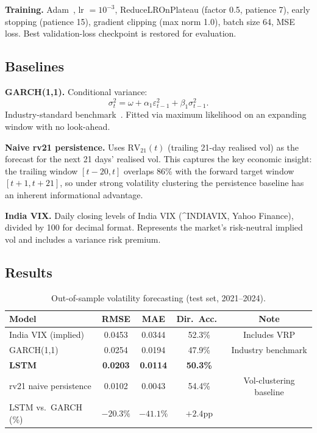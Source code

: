 \documentclass[12pt,a4paper]{article}
\begin{document}
\textbf{Training.}  Adam~\citep{Kingma2015}, lr $= 10^{-3}$,
ReduceLROnPlateau (factor 0.5, patience 7), early stopping (patience 15),
gradient clipping (max norm 1.0), batch size 64, MSE loss.
Best validation-loss checkpoint is restored for evaluation.

\subsection{Baselines}

\textbf{GARCH(1,1).}  Conditional variance:
\begin{equation}
  \sigma_t^2 = \omega + \alpha_1\varepsilon_{t-1}^2 + \beta_1\sigma_{t-1}^2.
  \label{eq:garch}
\end{equation}
Industry-standard benchmark~\citep{Bollerslev1986,Engle1982}.  Fitted via
maximum likelihood on an expanding window with no look-ahead.

\textbf{Naive rv21 persistence.}  Uses $\mathrm{RV}_{21}(t)$ (trailing
21-day realised vol) as the forecast for the next 21 days' realised vol.
This captures the key economic insight: the trailing window $[t-20, t]$
overlaps 86\% with the forward target window $[t+1, t+21]$, so under
strong volatility clustering the persistence baseline has an inherent
informational advantage.

\textbf{India VIX.}  Daily closing levels of India VIX (\^{}INDIAVIX,
Yahoo Finance), divided by 100 for decimal format.  Represents the market's
risk-neutral implied vol and includes a variance risk premium.

\subsection{Results}

\begin{table}[H]
  \centering
  \caption{Out-of-sample volatility forecasting (test set, 2021--2024).}
  \label{tab:p3_main}
  \begin{tabular}{lcccc}
    \toprule
    Model & RMSE & MAE & Dir.\ Acc.\ & Note \\
    \midrule
    India VIX (implied)   & 0.0453 & 0.0344 & 52.3\% & Includes VRP \\
    GARCH(1,1)            & 0.0254 & 0.0194 & 47.9\% & Industry benchmark \\
    \textbf{LSTM}         & \textbf{0.0203} & \textbf{0.0114} & \textbf{50.3\%} & \\
    rv21 naive persistence& 0.0102 & 0.0043 & 54.4\% & Vol-clustering baseline \\
    \midrule
    LSTM vs.\ GARCH (\%) & $-20.3\%$ & $-41.1\%$ & $+2.4$pp & \\
    \bottomrule
  \end{tabular}
\end{table}
\end{document}
